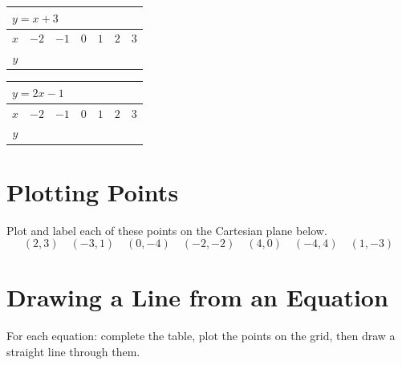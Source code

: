 \documentclass[11pt]{article}
\newcommand{\gridaxis}[5]{%
  \begin{axis}[
    width=7cm, height=6.4cm,
    xmin=#1, xmax=#2, ymin=#3, ymax=#4,
    grid=both, grid style={line width=.1pt, draw=gray!35},
    axis lines=middle,
    xlabel={$x$}, ylabel={$y$},
    xtick distance=#5, ytick distance=#5,
    tick label style={font=\tiny},
    label style={font=\small},
    xlabel style={at={(axis description cs:1,0)}, anchor=north west},
    ylabel style={at={(axis description cs:0,1)}, anchor=south east},
    axis line style={-{Latex[length=1.8mm]}},
  ]
}
\begin{document}
\begin{center}
\begin{tabular}{|c|c|c|c|c|c|c|}
\hline
\multicolumn{7}{|l|}{$y = x + 3$} \\\hline
$x$ & $-2$ & $-1$ & $0$ & $1$ & $2$ & $3$ \\\hline
$y$ & & & & & & \\\hline
\end{tabular}

\vspace{1em}

\begin{tabular}{|c|c|c|c|c|c|c|}
\hline
\multicolumn{7}{|l|}{$y = 2x - 1$} \\\hline
$x$ & $-2$ & $-1$ & $0$ & $1$ & $2$ & $3$ \\\hline
$y$ & & & & & & \\\hline
\end{tabular}
\end{center}

\vspace{1em}
\section{Plotting Points}
\noindent Plot and label each of these points on the Cartesian plane below.
\[
  (2,3) \quad (-3,1) \quad (0,-4) \quad (-2,-2) \quad (4,0) \quad (-4,4) \quad (1,-3)
\]

\begin{center}
\end{center}

\newpage
\section{Drawing a Line from an Equation}
\noindent For each equation: complete the table, plot the points on the grid, then draw a straight line through them.
\end{document}
